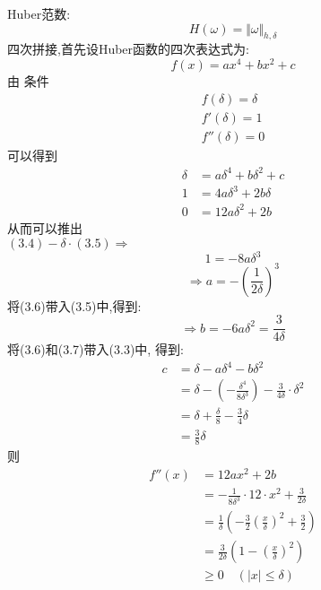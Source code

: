 \documentclass[245.0pt]{article}
\begin{document}
\newpage
Huber范数:
\begin{equation*}
H(\omega) = \Vert\omega\Vert_{h,\delta}\tag{3.1}
\end{equation*}
四次拼接,首先设Huber函数的四次表达式为:
\begin{equation*}
f(x) = a x^{4} + b x ^{2} +c \tag{3.2}
\end{equation*}
由 条件
\begin{equation*}
\begin{split}
f(\delta ) = \delta \\
f'(\delta ) = 1 \\
f''(\delta ) = 0 
\end{split}
\end{equation*}
%
可以得到
\begin{align*}
\delta &= a \delta^{4} + b \delta^{2} + c \tag{3.3} \\
1 &= 4a \delta^{3} + 2b \delta \tag{3.4} \\
0 &= 12a \delta^{2} + 2b \tag{3.5}
\end{align*}
%
从而可以推出 \\
$(3.4) - \delta \cdot (3.5) \Rightarrow$
\begin{equation*}
1 = - 8a\delta^{3}
\end{equation*}
\begin{equation*}
\Rightarrow a = - (\frac{1}{2 \delta} )^{3} \tag{3.6}
\end{equation*}
将(3.6)带入(3.5)中,得到:
\begin{equation*}
\Rightarrow b = - 6a \delta^{2} = \frac{3}{4 \delta} \tag{3.7}
\end{equation*}
将(3.6)和(3.7)带入(3.3)中, 得到:
\begin{equation*}
\begin{split}
c &= \delta - a \delta^{4} - b \delta^{2} \\
&= \delta - ( - \frac{\delta^{4}}{8 \delta^{3}} ) - \frac{3}{4 \delta} \cdot \delta^{2} \\
&= \delta + \frac{\delta}{8} - \frac{3}{4} \delta \\
&= \frac{3}{8} \delta
\end{split} \tag{3.8}
\end{equation*}
则
\begin{equation*}
\begin{split}
f''(x) &= 12 a x^{2} + 2b \\
&= - \frac{1}{8 \delta^{3}} \cdot 12 \cdot x^{2} + \frac{3}{2\delta} \\
&= \frac{1}{\delta} ( - \frac{3}{2} (\frac{x}{\delta})^{2} + \frac{3}{2} ) \\
&= \frac{3}{2 \delta} ( 1 - (\frac{x}{\delta} )^{2} ) \\
&\geq 0 \quad ( \vert x \vert \leq \delta )
\end{split} \tag{3.9}
\end{equation*}
\end{document}
